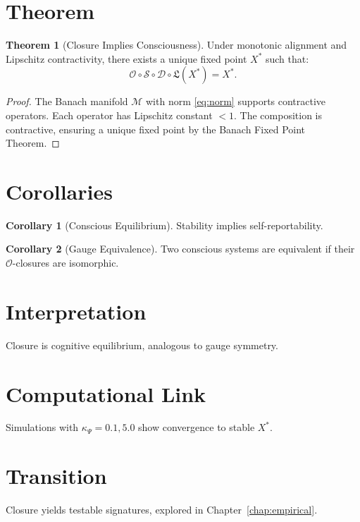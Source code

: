 \documentclass[12pt]{book}
\theoremstyle{definition}
\newtheorem{theorem}{Theorem}[chapter]
\newtheorem{corollary}{Corollary}[theorem]
\begin{document}
\section{Theorem}
\begin{theorem}[Closure Implies Consciousness]
\label{thm:closure}
Under monotonic alignment and Lipschitz contractivity, there exists a unique fixed point \(X^*\) such that:
\begin{equation}
\mathcal{O} \circ \mathcal{S} \circ \mathcal{D} \circ \mathfrak{L}(X^*) = X^*.
\end{equation}
\end{theorem}

\begin{proof}
The Banach manifold \(\mathcal{M}\) with norm \eqref{eq:norm} supports contractive operators. Each operator has Lipschitz constant \(<1\). The composition is contractive, ensuring a unique fixed point by the Banach Fixed Point Theorem.
\end{proof}

\section{Corollaries}
\begin{corollary}[Conscious Equilibrium]
Stability implies self-reportability.
\end{corollary}

\begin{corollary}[Gauge Equivalence]
Two conscious systems are equivalent if their \(\mathcal{O}\)-closures are isomorphic.
\end{corollary}

\section{Interpretation}
Closure is cognitive equilibrium, analogous to gauge symmetry.

\section{Computational Link}
Simulations with \(\kappa_\Psi = 0.1, 5.0\) show convergence to stable \(X^*\).

\section{Transition}
Closure yields testable signatures, explored in Chapter~\ref{chap:empirical}.
\end{document}
